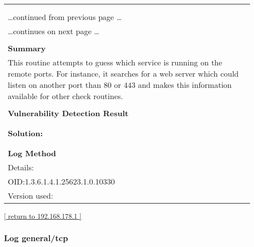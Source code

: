 \documentclass{article}
\begin{document}
\begin{longtable}{|p{}|}
\hline
\rowcolor{gvm_log}{\color{white}{Log (CVSS: 0.0) }}\\
\rowcolor{gvm_log}{\color{white}{NVT: Services}}\\
\hline
\endfirsthead
\hfill\ldots continued from previous page \ldots \\
\hline
\endhead
\hline
\ldots continues on next page \ldots \\
\endfoot
\hline
\endlastfoot
\\
\textbf{Summary}\\
This routine attempts to guess which service is running on the
  remote ports. For instance, it searches for a web server which could listen on another port than
  80 or 443 and makes this information available for other check routines.\\

        \hline
        \\
\textbf{Vulnerability Detection Result}\\
\rowcolor{white}{\verb=A web server is running on this port=}\\

          \hline
          \\
\textbf{Solution:}\\
\\


        \hline
        \\
\textbf{Log Method}\\
Details:
\rowcolor{white}{\verb=Services=}\\
OID:1.3.6.1.4.1.25623.1.0.10330\\
Version used:
\rowcolor{white}{\verb=2021-03-15T10:42:03Z=}\\
\end{longtable}

\begin{footnotesize}\hyperref[host:192.168.178.1]{[ return to 192.168.178.1 ]}\end{footnotesize}
\subsubsection{Log general/tcp}
\label{port:192.168.178.1 general/tcp Log}
\end{document}
